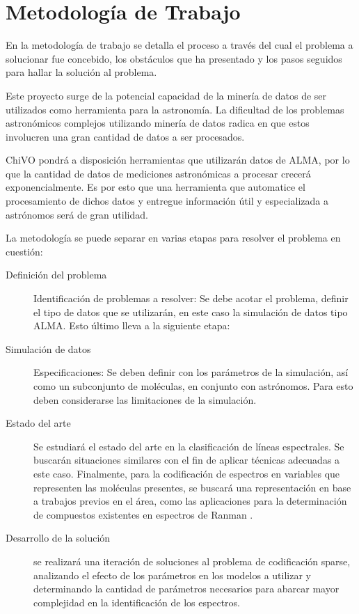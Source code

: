 \section{Metodología de Trabajo}

En la metodología de trabajo se detalla el proceso a través del cual el problema a solucionar fue concebido, los obstáculos que ha presentado y los pasos seguidos para hallar la solución al problema.

Este proyecto surge de la potencial capacidad de la minería de datos de ser utilizados como herramienta para la astronomía. La dificultad de los problemas astronómicos complejos utilizando minería de datos radica en que estos involucren una gran cantidad de datos a ser procesados.

ChiVO pondrá a disposición herramientas que utilizarán datos de ALMA, por lo que la cantidad de datos de mediciones astronómicas a procesar crecerá exponencialmente. Es por esto que una herramienta que automatice el procesamiento de dichos datos y entregue información útil y especializada a astrónomos será de gran utilidad.

La metodología se puede separar en varias etapas para resolver el problema en
cuestión:


\begin{description}
\item [Definición del problema] Identificación de problemas a resolver: Se debe acotar el problema, definir el tipo de datos que se utilizarán, en este caso la simulación de datos tipo ALMA. Esto último lleva a la siguiente etapa:

\item [Simulación de datos] Especificaciones: Se deben definir con los parámetros de la simulación, así como un subconjunto de moléculas, en conjunto con astrónomos. Para esto deben considerarse las limitaciones de la simulación.

\item [Estado del arte] Se estudiará el estado del arte en la clasificación de líneas espectrales. Se buscarán situaciones similares con el fin de aplicar técnicas adecuadas a este caso. Finalmente, para la codificación de espectros en variables que representen las moléculas presentes, se buscará una representación en base a trabajos previos en el área, como las aplicaciones para la determinación de compuestos existentes en espectros de Ranman \cite{howley_effect_2005}.

\item [Desarrollo de la solución] se realizará una iteración de soluciones al problema de codificación sparse, analizando el efecto de los parámetros en los modelos a utilizar y determinando la cantidad de parámetros necesarios para abarcar mayor complejidad en la identificación de los espectros.
\end{description}


